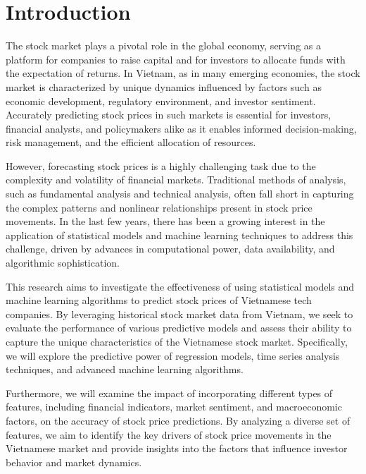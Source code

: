 \documentclass{ieeeojies}
\begin{document}
\titlepgskip=-15pt

\maketitle

\section{Introduction}
\label{sec:introduction}
The stock market plays a pivotal role in the global economy, serving as a platform for companies to raise capital and for investors to allocate funds with the expectation of returns. In Vietnam, as in many emerging economies, the stock market is characterized by unique dynamics influenced by factors such as economic development, regulatory environment, and investor sentiment. Accurately predicting stock prices in such markets is essential for investors, financial analysts, and policymakers alike as it enables informed decision-making, risk management, and the efficient allocation of resources.

However, forecasting stock prices is a highly challenging task due to the complexity and volatility of financial markets. Traditional methods of analysis, such as fundamental analysis and technical analysis, often fall short in capturing the complex patterns and nonlinear relationships present in stock price movements. In the last few years, there has been a growing interest in the application of statistical models and machine learning techniques to address this challenge, driven by advances in computational power, data availability, and algorithmic sophistication.

This research aims to investigate the effectiveness of using statistical models and machine learning algorithms to predict stock prices of Vietnamese tech companies. By leveraging historical stock market data from Vietnam, we seek to evaluate the performance of various predictive models and assess their ability to capture the unique characteristics of the Vietnamese stock market. Specifically, we will explore the predictive power of regression models, time series analysis techniques, and advanced machine learning algorithms.

Furthermore, we will examine the impact of incorporating different types of features, including financial indicators, market sentiment, and macroeconomic factors, on the accuracy of stock price predictions. By analyzing a diverse set of features, we aim to identify the key drivers of stock price movements in the Vietnamese market and provide insights into the factors that influence investor behavior and market dynamics.
\end{document}
